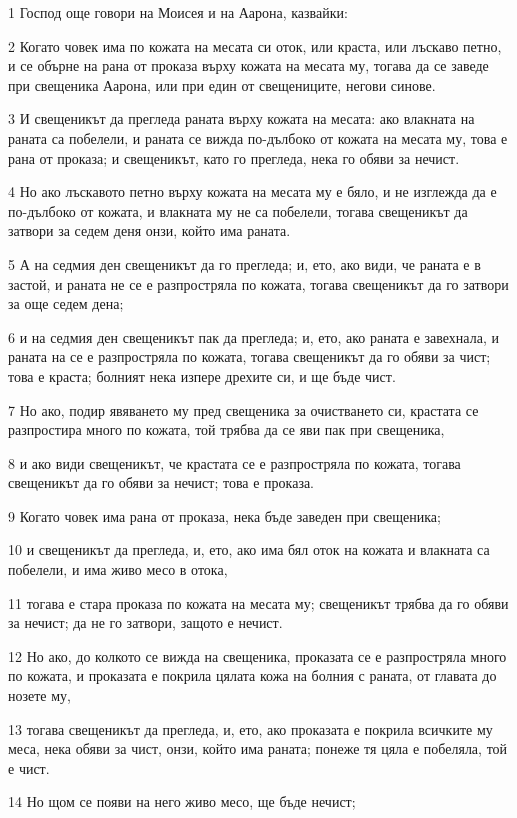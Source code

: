 \par 1 Господ още говори на Моисея и на Аарона, казвайки:
\par 2 Когато човек има по кожата на месата си оток, или краста, или лъскаво петно, и се обърне на рана от проказа върху кожата на месата му, тогава да се заведе при свещеника Аарона, или при един от свещениците, негови синове.
\par 3 И свещеникът да прегледа раната върху кожата на месата: ако влакната на раната са побелели, и раната се вижда по-дълбоко от кожата на месата му, това е рана от проказа; и свещеникът, като го прегледа, нека го обяви за нечист.
\par 4 Но ако лъскавото петно върху кожата на месата му е бяло, и не изглежда да е по-дълбоко от кожата, и влакната му не са побелели, тогава свещеникът да затвори за седем деня онзи, който има раната.
\par 5 А на седмия ден свещеникът да го прегледа; и, ето, ако види, че раната е в застой, и раната не се е разпростряла по кожата, тогава свещеникът да го затвори за още седем дена;
\par 6 и на седмия ден свещеникът пак да прегледа; и, ето, ако раната е завехнала, и раната на се е разпростряла по кожата, тогава свещеникът да го обяви за чист; това е краста; болният нека изпере дрехите си, и ще бъде чист.
\par 7 Но ако, подир явяването му пред свещеника за очистването си, крастата се разпростира много по кожата, той трябва да се яви пак при свещеника,
\par 8 и ако види свещеникът, че крастата се е разпростряла по кожата, тогава свещеникът да го обяви за нечист; това е проказа.
\par 9 Когато човек има рана от проказа, нека бъде заведен при свещеника;
\par 10 и свещеникът да прегледа, и, ето, ако има бял оток на кожата и влакната са побелели, и има живо месо в отока,
\par 11 тогава е стара проказа по кожата на месата му; свещеникът трябва да го обяви за нечист; да не го затвори, защото е нечист.
\par 12 Но ако, до колкото се вижда на свещеника, проказата се е разпростряла много по кожата, и проказата е покрила цялата кожа на болния с раната, от главата до нозете му,
\par 13 тогава свещеникът да прегледа, и, ето, ако проказата е покрила всичките му меса, нека обяви за чист, онзи, който има раната; понеже тя цяла е побеляла, той е чист.
\par 14 Но щом се появи на него живо месо, ще бъде нечист;
